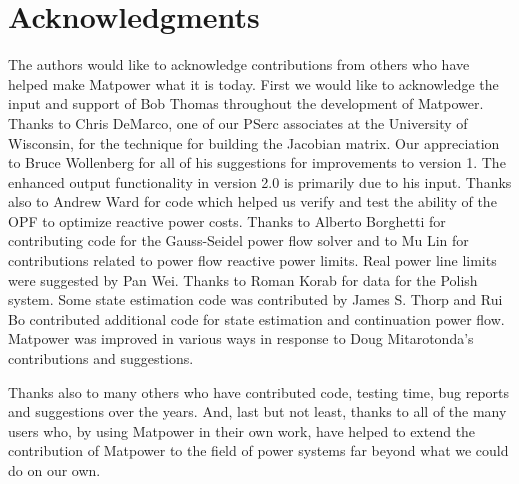 \documentclass[12pt]{article}
\newcommand{\matpower}[0]{{\sc Matpower}}
\newcommand{\pserc}[0]{{\sc PSerc}}
\numberwithin{equation}{section}
\numberwithin{table}{section}
\numberwithin{figure}{section}
\begin{document}
\section{Acknowledgments}
The authors would like to acknowledge contributions from others who have helped make \matpower{} what it is today. First we would like to acknowledge the input and support of Bob Thomas throughout the development of \matpower{}. Thanks to Chris DeMarco, one of our \pserc{} associates at the University of Wisconsin, for the technique for building the Jacobian matrix. Our appreciation to Bruce Wollenberg for all of his suggestions for improvements to version 1. The enhanced output functionality in version 2.0 is primarily due to his input. Thanks also to Andrew Ward for code which helped us verify and test the ability of the OPF to optimize reactive power costs. Thanks to Alberto Borghetti for contributing code for the Gauss-Seidel power flow solver and to Mu Lin for contributions related to power flow reactive power limits. Real power line limits were suggested by Pan Wei. Thanks to Roman Korab for data for the Polish system. Some state estimation code was contributed by James S. Thorp and Rui Bo contributed additional code for state estimation and continuation power flow.  \matpower{} was improved in various ways in response to Doug Mitarotonda's contributions and suggestions.

Thanks also to many others who have contributed code, testing time, bug reports and suggestions over the years. And, last but not least, thanks to all of the many users who, by using \matpower{} in their own work, have helped to extend the contribution of \matpower{} to the field of power systems far beyond what we could do on our own.

\end{document}
